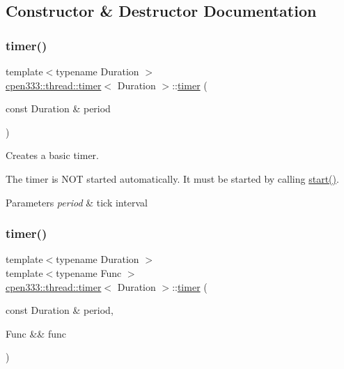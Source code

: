 \subsection{Constructor \& Destructor Documentation}
\mbox{\label{classcpen333_1_1thread_1_1timer_adf189ddfc276e7efa2c49ac9413627b9}} 
\subsubsection{\texorpdfstring{timer()}{timer()}\hspace{0.1cm}{\footnotesize\ttfamily [1/2]}}
{\footnotesize\ttfamily template$<$typename Duration $>$ \\
\hyperlink{classcpen333_1_1thread_1_1timer}{cpen333\+::thread\+::timer}$<$ Duration $>$\+::\hyperlink{classcpen333_1_1thread_1_1timer}{timer} (\begin{DoxyParamCaption}\item[{const Duration \&}]{period }\end{DoxyParamCaption})\hspace{0.3cm}{\ttfamily [inline]}}



Creates a basic timer. 

The timer is N\+OT started automatically. It must be started by calling \hyperlink{classcpen333_1_1thread_1_1timer_a0d1be90402f46912966ec5fc13707bce}{start()}.


\begin{DoxyParams}{Parameters}
{\em period} & tick interval \\
\hline
\end{DoxyParams}
\mbox{\label{classcpen333_1_1thread_1_1timer_a8eb8ec006064a7eed1f63d1ae2c74acd}} 
\subsubsection{\texorpdfstring{timer()}{timer()}\hspace{0.1cm}{\footnotesize\ttfamily [2/2]}}
{\footnotesize\ttfamily template$<$typename Duration $>$ \\
template$<$typename Func $>$ \\
\hyperlink{classcpen333_1_1thread_1_1timer}{cpen333\+::thread\+::timer}$<$ Duration $>$\+::\hyperlink{classcpen333_1_1thread_1_1timer}{timer} (\begin{DoxyParamCaption}\item[{const Duration \&}]{period,  }\item[{Func \&\&}]{func }\end{DoxyParamCaption})\hspace{0.3cm}{\ttfamily [inline]}}



